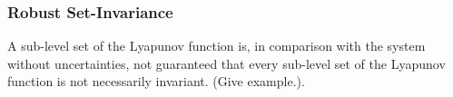 \begin{figure}
  \centering
  
  \label{fig:sos-program-additive}
\end{figure}

\subsubsection{Robust Set-Invariance}

A sub-level set of the Lyapunov function is, in comparison with the system
without uncertainties, not guaranteed that every sub-level set of the Lyapunov
function is not necessarily invariant. (Give example.).

